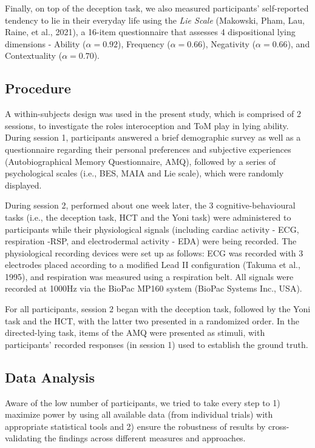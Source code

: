 \documentclass[
  man,mask,floatsintext]{apa6}
\begin{document}
Finally, on top of the deception task, we also measured participants' self-reported tendency to lie in their everyday life using the \emph{Lie Scale} (Makowski, Pham, Lau, Raine, et al., 2021), a 16-item questionnaire that assesses 4 dispositional lying dimensions - Ability (\(\alpha = 0.92\)), Frequency (\(\alpha = 0.66\)), Negativity (\(\alpha = 0.66\)), and Contextuality (\(\alpha = 0.70\)).

\hypertarget{procedure}{%
\subsection{Procedure}\label{procedure}}

A within-subjects design was used in the present study, which is comprised of 2 sessions, to investigate the roles interoception and ToM play in lying ability. During session 1, participants answered a brief demographic survey as well as a questionnaire regarding their personal preferences and subjective experiences (Autobiographical Memory Questionnaire, AMQ), followed by a series of psychological scales (i.e., BES, MAIA and Lie scale), which were randomly displayed.

During session 2, performed about one week later, the 3 cognitive-behavioural tasks (i.e., the deception task, HCT and the Yoni task) were administered to participants while their physiological signals (including cardiac activity - ECG, respiration -RSP, and electrodermal activity - EDA) were being recorded. The physiological recording devices were set up as follows: ECG was recorded with 3 electrodes placed according to a modified Lead II configuration (Takuma et al., 1995), and respiration was measured using a respiration belt. All signals were recorded at 1000Hz via the BioPac MP160 system (BioPac Systems Inc., USA).

For all participants, session 2 began with the deception task, followed by the Yoni task and the HCT, with the latter two presented in a randomized order. In the directed-lying task, items of the AMQ were presented as stimuli, with participants' recorded responses (in session 1) used to establish the ground truth.

\hypertarget{data-analysis}{%
\subsection{Data Analysis}\label{data-analysis}}

Aware of the low number of participants, we tried to take every step to 1) maximize power by using all available data (from individual trials) with appropriate statistical tools and 2) ensure the robustness of results by cross-validating the findings across different measures and approaches.
\end{document}
